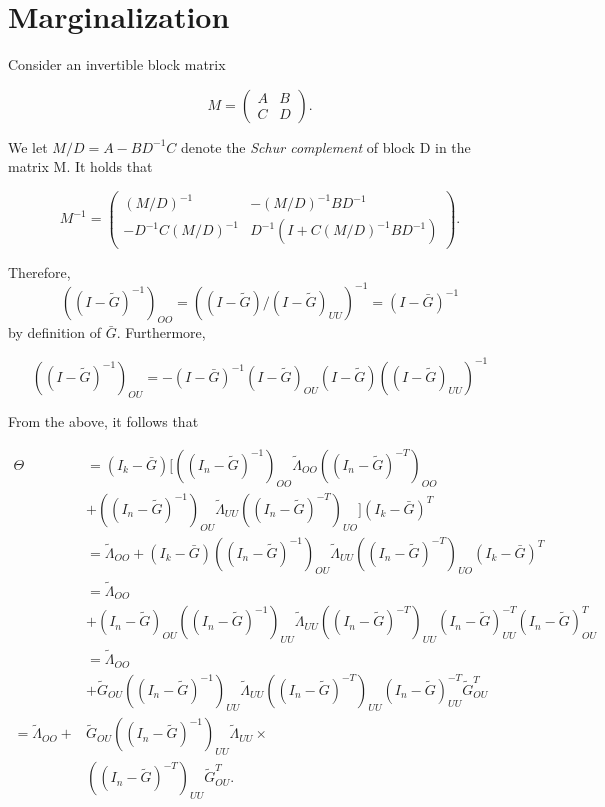 \documentclass[accepted]{uai2021} %
\begin{document}
\appendix

\section{Marginalization}
\label{sec:marg}

Consider an invertible block matrix 

$$
M=
\begin{pmatrix}
A & B \\
C & D
\end{pmatrix}.
$$

We let $M / D = A - BD^{-1}C$ denote the \emph{Schur complement} of block D in 
the matrix M. It holds that

$$
M^{-1}=
\begin{pmatrix}
(M/D)^{-1} & -(M/D)^{-1}BD^{-1} \\
-D^{-1}C(M/D)^{-1} & D^{-1}(I + C(M/D)^{-1}BD^{-1})
\end{pmatrix}.
$$

Therefore, $$((I - \tilde{G})^{-1})_{OO} = ((I - \tilde{G})/(I - 
\tilde{G})_{UU})^{-1} = (I- \bar{G})^{-1}$$ by definition of $\bar{G}$. 
Furthermore, 

$$
((I-\tilde{G})^{-1})_{OU} = 
-(I-\bar{G})^{-1}(I-\tilde{G})_{OU}(I-\tilde{G})((I-\tilde{G})_{UU})^{-1}
$$

From the above, it follows that

\begin{align*}
\Theta & = (I_k - \bar{G})[((I_n - 
\tilde{G})^{-1})_{OO}\tilde{\Lambda}_{OO}((I_n - \tilde{G})^{-T})_{OO} \\ & + 
((I_n 
- 
\tilde{G})^{-1})_{OU}\tilde{\Lambda}_{UU}((I_n - \tilde{G})^{-T})_{UO}](I_k - 
\bar{G})^T \\
& = \tilde{\Lambda}_{OO} + (I_k - \bar{G})((I_n 
- 
\tilde{G})^{-1})_{OU}\tilde{\Lambda}_{UU}((I_n - \tilde{G})^{-T})_{UO}(I_k - 
\bar{G})^T \\
& = \tilde{\Lambda}_{OO} \\ & + (I_n - \tilde{G})_{OU}((I_n - 
\tilde{G})^{-1})_{UU}\tilde{\Lambda}_{UU}((I_n - \tilde{G})^{-T})_{UU}(I_n - 
\tilde{G})_{UU}^{-T}(I_n - 
\tilde{G})_{OU}^T \\
& = \tilde{\Lambda}_{OO} \\ & + \tilde{G}_{OU}((I_n - 
\tilde{G})^{-1})_{UU}\tilde{\Lambda}_{UU}((I_n - \tilde{G})^{-T})_{UU}(I_n - 
\tilde{G})_{UU}^{-T} 
\tilde{G}_{OU}^T \\
= \tilde{\Lambda}_{OO} + & \tilde{G}_{OU}((I_n - 
\tilde{G})^{-1})_{UU}\tilde{\Lambda}_{UU} \times  \\ & ((I_n - 
\tilde{G})^{-T})_{UU}
\tilde{G}_{OU}^T.
\end{align*}



\end{document}
